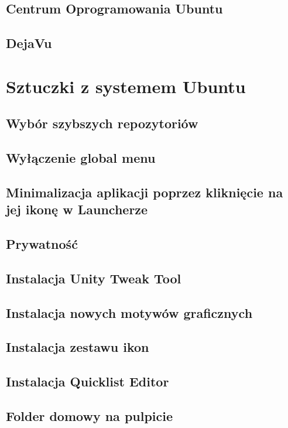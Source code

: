 \documentclass[a4paper,11pt,oneside,draft]{mwart}
\begin{document}
		\subsection{Centrum Oprogramowania Ubuntu}
			
		\subsection{DejaVu}
	\section{Sztuczki z systemem Ubuntu}
		
		\subsection{Wybór szybszych repozytoriów}
			
		\subsection{Wyłączenie global menu}
			
		\subsection{Minimalizacja aplikacji poprzez kliknięcie na jej ikonę w Launcherze}
			
		\subsection{Prywatność}
			
		\subsection{Instalacja Unity Tweak Tool}
			
		\subsection{Instalacja nowych motywów graficznych}
			
		\subsection{Instalacja zestawu ikon}
			
		\subsection{Instalacja Quicklist Editor}
			
		\subsection{Folder domowy na pulpicie}
			
\end{document}

